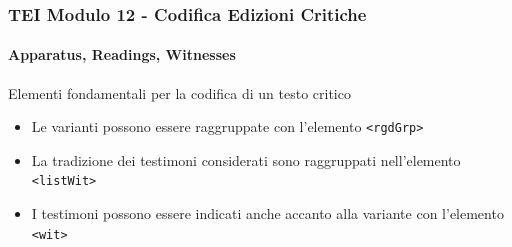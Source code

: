 \begin{frame}
    \frametitle{TEI Modulo 12 - Codifica Edizioni Critiche}
    \framesubtitle{Apparatus, Readings, Witnesses}
    \addtocounter{nframe}{1}











    \begin{block}{Elementi fondamentali per la codifica di un testo critico}
        \begin{itemize}
            \item Le varianti possono essere raggruppate con l'elemento \texttt{<rgdGrp>}
            \item La tradizione dei testimoni considerati sono raggruppati nell'elemento \texttt{<listWit>}
            \item I testimoni possono essere indicati anche accanto alla variante con l'elemento \texttt{<wit>}
        \end{itemize}
       
    \end{block}

\end{frame}

